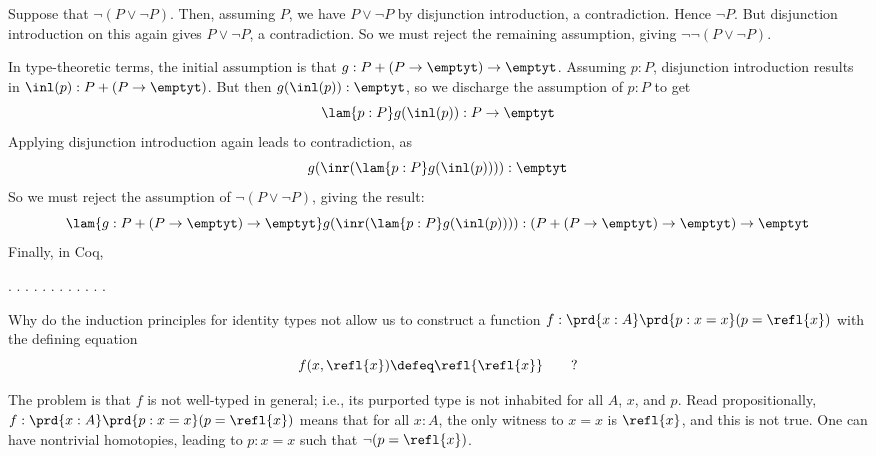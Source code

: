 \soln  
Suppose that $\lnot(P \lor \lnot P)$.  Then, assuming $P$, we have
$P \lor \lnot P$ by disjunction introduction, a contradiction.  Hence
$\lnot P$.  But disjunction introduction on this again gives $P \lor \lnot P$,
a contradiction.  So we must reject the remaining assumption, giving
$\lnot\lnot(P \lor \lnot P)$.


In type-theoretic terms, the initial assumption is that $g : P + (P \to
\emptyt) \to \emptyt$.  Assuming $p : P$, disjunction introduction results in
$\inl(p) : P + (P \to \emptyt)$.  But then $g(\inl(p)) : \emptyt$, so we
discharge the assumption of $p : P$ to get
\[
\lam{p:P}g(\inl(p)) : P \to \emptyt
\]
Applying disjunction introduction again leads to contradiction, as
\[
g(\inr(\lam{p:P}g(\inl(p)))) : \emptyt
\]
So we must reject the assumption of $\lnot( P \lor \lnot P)$, giving the
result:
\[
\lam{g:P + (P \to \emptyt) \to \emptyt}g(\inr(\lam{p:P}g(\inl(p)))) 
: 
(P + (P \to \emptyt) \to \emptyt) \to \emptyt
\]
Finally, in Coq, \begin{coqdoccode}
\coqdocemptyline
\coqdocindent{1.00em}
 \coqdocnotation{\ensuremath{\lnot}} \coqdocnotation{\ensuremath{\lnot}} \coqdocnotation{(}  \coqdocnotation{\ensuremath{\lnot}}\coqdocnotation{)}.\coqdoceol
\coqdocindent{1.00em}
.\coqdoceol
\coqdocindent{2.00em}
 .\coqdoceol
\coqdocindent{2.00em}
 .\coqdoceol
\coqdocindent{2.00em}
 .\coqdoceol
\coqdocindent{2.00em}
.\coqdoceol
\coqdocindent{2.00em}
 .\coqdoceol
\coqdocindent{2.00em}
 .\coqdoceol
\coqdocindent{2.00em}
.\coqdoceol
\coqdocindent{2.00em}
 .\coqdoceol
\coqdocindent{1.00em}
.\coqdoceol
\coqdocemptyline
\coqdocnoindent
{} .\coqdoceol
\coqdocemptyline
\end{coqdoccode}


Why do the induction principles for identity types not allow
us to construct a function $f : \prd{x:A}\prd{p:x=x}(p = \refl{x})$ with the
defining equation
\[
f(x, \refl{x}) \defeq \refl{\refl{x}}\qquad?
\] 

 \soln
The problem is that $f$ is not well-typed in general; i.e., its purported type
is not inhabited for all $A$, $x$, and $p$.  Read propositionally, $f :
\prd{x:A}\prd{p:x=x}(p = \refl{x})$ means that for all $x:A$, the only witness
to $x = x$ is $\refl{x}$, and this is not true.  One can have nontrivial
homotopies, leading to $p : x = x$ such that $\lnot (p = \refl{x})$.


